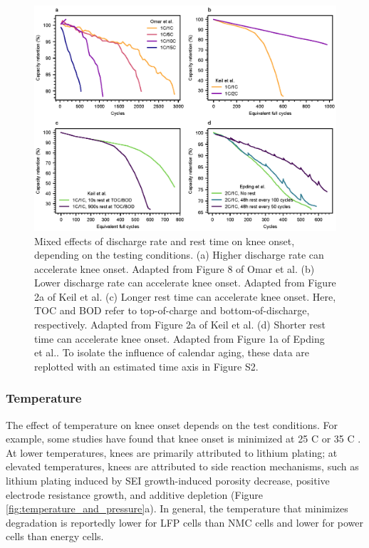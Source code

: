 \documentclass[journal=jpclcd,manuscript=article]{achemso}
\begin{document}
\begin{figure}[ht!]
\centering
\includegraphics[scale = 1.0]{figures/discharge_rate_rest_cycles.eps}
\caption{Mixed effects of discharge rate and rest time on knee onset, depending on the testing conditions. (a) Higher discharge rate can accelerate knee onset. Adapted from Figure 8 of Omar et al.\cite{omar_lithium_2014} (b) Lower discharge rate can accelerate knee onset. Adapted from Figure 2a of Keil et al.\cite{keil_linear_2019} (c) Longer rest time can accelerate knee onset. Here, TOC and BOD refer to top-of-charge and bottom-of-discharge, respectively. Adapted from  Figure 2a of Keil et al.\cite{keil_linear_2019} (d) Shorter rest time can accelerate knee onset. Adapted from Figure 1a of Epding et al.\cite{epding_investigation_2019}. To isolate the influence of calendar aging, these data are replotted with an estimated time axis in Figure S2.}
\label{fig:discharge-rest_cycle}
\end{figure}


\subsubsection{Temperature}
The effect of temperature on knee onset depends on the test conditions. For example, some studies have found that knee onset is minimized at 25 \degree C \cite{zhang_accelerated_2019, waldmann_temperature_2014, waldmann_optimization_2015} or 35 \degree C \cite{schuster_nonlinear_2015}. At lower temperatures, knees are primarily attributed to lithium plating; at elevated temperatures, knees are attributed to side reaction mechanisms, such as lithium plating induced by SEI growth-induced porosity decrease, positive electrode resistance growth, and additive depletion (Figure \ref{fig:temperature_and_pressure}a).\cite{broussely_main_2005, zhang_accelerated_2019,schuster_nonlinear_2015,waldmann_temperature_2014,waldmann_optimization_2015} In general, the temperature that minimizes degradation is reportedly lower for LFP cells than NMC cells \cite{preger_degradation_2020} and lower for power cells than energy cells\cite{yang_understanding_2018}.
\end{document}
